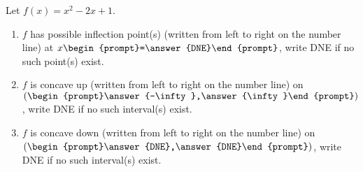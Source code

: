 \documentclass{ximera}
\author{Gregory Hartman \and Matthew Carr}
\begin{document}
\begin{exercise}




Let $f(x)=x^2-2x+1$. 
\begin{enumerate}
\item		$f$ has possible inflection point(s) (written from left to right on the number line) at $x\begin{prompt}=\answer{DNE}\end{prompt}$, write DNE if no such point(s) exist.
\item		$f$ is concave up (written from left to right on the number line) on $(\begin{prompt}\answer{-\infty},\answer{\infty}\end{prompt})$, write DNE if no such interval(s) exist.
\item		$f$ is concave down (written from left to right on the number line) on $(\begin{prompt}\answer{DNE},\answer{DNE}\end{prompt})$, write DNE if no such interval(s) exist.
\end{enumerate}

\end{exercise}
\end{document}
